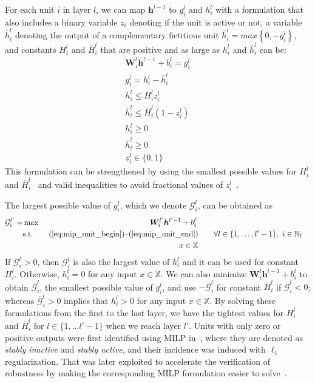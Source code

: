 \documentclass[runningheads]{llncs}
\def\vh{{\bm{h}}}
\def\evb{{b}}
\def\evg{{g}}
\def\evh{{h}}
\def\evz{{z}}
\def\mW{{\bm{W}}}
\def\sN{{\mathbb{N}}}
\def\sX{{\mathbb{X}}}
\begin{document}
        For each unit $i$ in layer $l$, we can map $\vh^{l-1}$ to $g_i^l$ and $h_i^l$ with a formulation that also includes a binary variable $\evz_i$ denoting if the unit is active or not, a variable $\bar{\evh}^l_i$ denoting the output of a complementary fictitious unit $\bar{\evh}^l_i = max\left\{0, -\evg_i^l \right\}$, and 
        constants $H_i^l$ and $\bar{H}_i^l$ that are positive and as large as $\evh_i^l$ and $\bar{\evh}_i^l$ can be: 
\begin{align}
            \mW_i^l \vh^{l-1} + \evb_i^l = \evg_i^l \label{eq:mip_unit_begin} \\
            \evg_i^l = \evh_i^l - \bar{\evh}_i^l  \label{eq:mip_after_Wb_begin} \\
            \evh_i^l \leq H_i^l \evz_i^l \\ 
            \bar{\evh}_i^l \leq \bar{H}_i^l (1-\evz_i^l) \\
            \evh_i^l \geq 0 \\
            \bar{\evh}_i^l \geq 0 \\
            \evz_i^l \in \{0, 1\} \label{eq:mip_unit_end}
        \end{align}
        This formulation can be strengthened by using the smallest possible values for $H_i^l$ and $\bar{H}_i^l$~\cite{FischettiMIP,tjeng2017evaluating} and valid inequalities to avoid fractional values of $z_i^l$~\cite{anderson2019strong,serra2020empirical}. 
        
        The largest possible value of $\evg_i^l$, which we denote $\mathcal{G}_i^l$, can be obtained as 
        \begin{align}
            \mathcal{G}_i^{l'} = & \max ~ & \mW_i^{l'} \vh^{{l'}-1} + \evb_i^{l'} \label{eq:obj} \\
            &\text{s.t.} ~ &  \text{(\ref{eq:mip_unit_begin})--(\ref{eq:mip_unit_end})}  & \qquad  \forall l \in \{1, \ldots, l'-1\}, ~ i \in \sN_l \\
            && x \in \sX \label{eq:last_mi}
        \end{align}
If $\mathcal{G}_i^l > 0$, then $\mathcal{G}_i^l$ is also the largest value of $\evh_i^l$ and it can be used for constant $H_i^l$. Otherwise, $\evh_i^l = 0$ for any input $x \in \sX$. We can also minimize $\mW_i^l \vh^{l-1} + \evb_i^l$ to obtain $\overline{\mathcal{G}}_i^l$, the smallest possible value of $\evg_i^l$, and use $-\overline{\mathcal{G}}_i^l$ for constant $\bar{H}_i^l$ if $\overline{\mathcal{G}}_i^l < 0$; whereas $\overline{\mathcal{G}}_i^l > 0$ implies that $\evh_i^l > 0$ for any input $x \in \sX$. By solving these formulations from the first to the last layer, we have the tightest values for $H_i^l$ and $\bar{H}_i^l$ for $l \in \{1, \ldots l'-1\}$ when we reach layer $l'$. 
Units with only zero or positive outputs were first identified using MILP in~\cite{tjeng2017evaluating}, where they are denoted as \emph{stably inactive} and \emph{stably active}, and their incidence was induced with $\ell_1$ regularization. That was later exploited to accelerate the verification of robustness by making the corresponding MILP formulation easier to solve~\cite{xiao2018training}.
    
\end{document}
